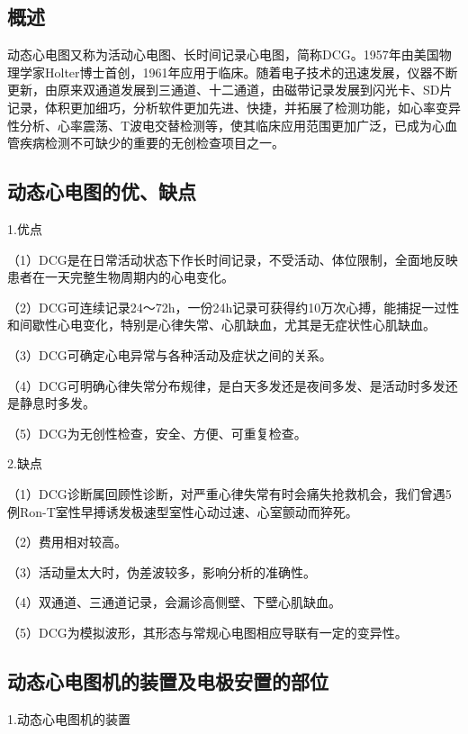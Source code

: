 \subsection{概述}

动态心电图又称为活动心电图、长时间记录心电图，简称DCG。1957年由美国物理学家Holter博士首创，1961年应用于临床。随着电子技术的迅速发展，仪器不断更新，由原来双通道发展到三通道、十二通道，由磁带记录发展到闪光卡、SD片记录，体积更加细巧，分析软件更加先进、快捷，并拓展了检测功能，如心率变异性分析、心率震荡、T波电交替检测等，使其临床应用范围更加广泛，已成为心血管疾病检测不可缺少的重要的无创检查项目之一。

\protect\hypertarget{text00056.htmlux5cux23subid672}{}{}

\subsection{动态心电图的优、缺点}

1.优点

（1）DCG是在日常活动状态下作长时间记录，不受活动、体位限制，全面地反映患者在一天完整生物周期内的心电变化。

（2）DCG可连续记录24～72h，一份24h记录可获得约10万次心搏，能捕捉一过性和间歇性心电变化，特别是心律失常、心肌缺血，尤其是无症状性心肌缺血。

（3）DCG可确定心电异常与各种活动及症状之间的关系。

（4）DCG可明确心律失常分布规律，是白天多发还是夜间多发、是活动时多发还是静息时多发。

（5）DCG为无创性检查，安全、方便、可重复检查。

2.缺点

（1）DCG诊断属回顾性诊断，对严重心律失常有时会痛失抢救机会，我们曾遇5例Ron-T室性早搏诱发极速型室性心动过速、心室颤动而猝死。

（2）费用相对较高。

（3）活动量太大时，伪差波较多，影响分析的准确性。

（4）双通道、三通道记录，会漏诊高侧壁、下壁心肌缺血。

（5）DCG为模拟波形，其形态与常规心电图相应导联有一定的变异性。

\protect\hypertarget{text00056.htmlux5cux23subid673}{}{}

\subsection{动态心电图机的装置及电极安置的部位}

1.动态心电图机的装置

